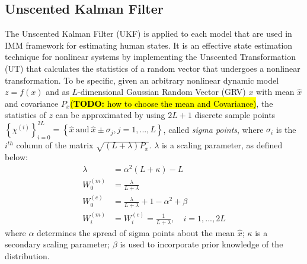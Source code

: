 \documentclass[letterpaper, 10 pt, conference]{ieeeconf}
\newcommand{\todohere}[1]{\hl{(\textbf{TODO:} #1)}}
\begin{document}
	\subsection{Unscented Kalman Filter}\label{subsec:UKF}
	The Unscented Kalman Filter (UKF) is applied to each model that are used in IMM framework for estimating human states. 
	It is an effective state estimation technique for nonlinear systems by implementing the Unscented Transformation (UT) that calculates the statistics of a random vector that undergoes a nonlinear transformation\cite {KalmanFiltering}.
	To be specific, given an arbitrary nonlinear dynamic model $z=f(x)$ and as $L$-dimensional Gaussian Random Vector (GRV) $x$ with mean $\hat{x}$ and covariance $P_x$\todohere{how to choose the mean and Covariance}, the statistics of $z$ can be approximated by using $2L+1$ discrete sample points $\left\{\chi^{(i)} \right\}_{i=0}^{2L}=\left\{ \hat{x}\ \text{and}\  \hat{x} \pm \sigma_j, j=1,...,L\right \}$, called \textit{sigma points}, where $\sigma_i$ is the $i^{th}$ column of the matrix $\sqrt{(L+\lambda)P_x}$. $\lambda$ is a scaling parameter, as defined below:
	\begin{subequations}
		\begin{align}
			\lambda&=\alpha^2(L+\kappa)-L\\
			W_0^{(m)}&=\frac{\lambda}{L+\lambda}\\
			W_0^{(c)}&=\frac{\lambda}{L+\lambda}+1-\alpha^2+\beta\\
			W_i^{(m)}&=W_i^{(c)}=\frac{1}{L+\lambda},\quad i=1,...,2L 
		\end{align}
	\end{subequations}
	where $\alpha$ determines the spread of sigma points about the mean $\hat{x}$; $\kappa$ is a secondary scaling parameter; $\beta$ is used to incorporate prior knowledge of the distribution.	
	
\end{document}
